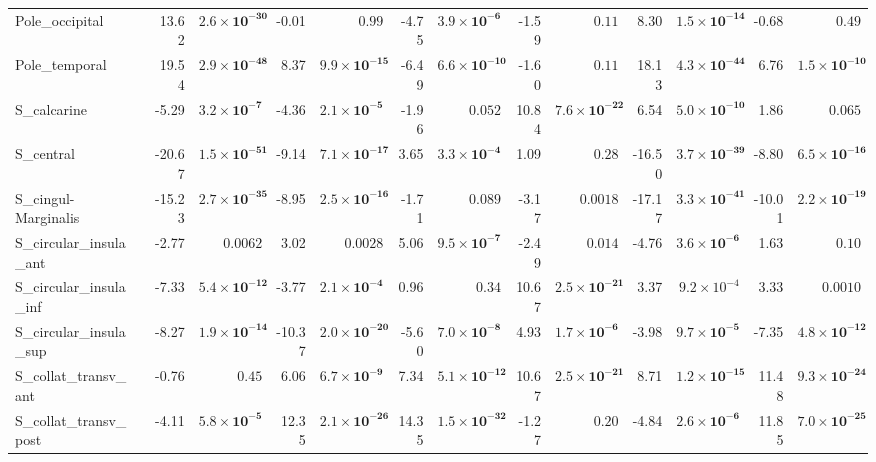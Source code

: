 {\begin{longtable}{llrrrrrrrrrrrr}
Pole\_occipital &  & 13.62 & $\mathbf{2.6{\times}10^{-30}}$ & -0.01 & $0.99$ & -4.75 & $\mathbf{3.9{\times}10^{-6}}$ & -1.59 & $0.11$ & 8.30 & $\mathbf{1.5{\times}10^{-14}}$ & -0.68 & $0.49$ \\
Pole\_temporal &  & 19.54 & $\mathbf{2.9{\times}10^{-48}}$ & 8.37 & $\mathbf{9.9{\times}10^{-15}}$ & -6.49 & $\mathbf{6.6{\times}10^{-10}}$ & -1.60 & $0.11$ & 18.13 & $\mathbf{4.3{\times}10^{-44}}$ & 6.76 & $\mathbf{1.5{\times}10^{-10}}$ \\
S\_calcarine &  & -5.29 & $\mathbf{3.2{\times}10^{-7}}$ & -4.36 & $\mathbf{2.1{\times}10^{-5}}$ & -1.96 & $0.052$ & 10.84 & $\mathbf{7.6{\times}10^{-22}}$ & 6.54 & $\mathbf{5.0{\times}10^{-10}}$ & 1.86 & $0.065$ \\
S\_central &  & -20.67 & $\mathbf{1.5{\times}10^{-51}}$ & -9.14 & $\mathbf{7.1{\times}10^{-17}}$ & 3.65 & $\mathbf{3.3{\times}10^{-4}}$ & 1.09 & $0.28$ & -16.50 & $\mathbf{3.7{\times}10^{-39}}$ & -8.80 & $\mathbf{6.5{\times}10^{-16}}$ \\
S\_cingul-Marginalis &  & -15.23 & $\mathbf{2.7{\times}10^{-35}}$ & -8.95 & $\mathbf{2.5{\times}10^{-16}}$ & -1.71 & $0.089$ & -3.17 & $0.0018$ & -17.17 & $\mathbf{3.3{\times}10^{-41}}$ & -10.01 & $\mathbf{2.2{\times}10^{-19}}$ \\
S\_circular\_insula\_ant &  & -2.77 & $0.0062$ & 3.02 & $0.0028$ & 5.06 & $\mathbf{9.5{\times}10^{-7}}$ & -2.49 & $0.014$ & -4.76 & $\mathbf{3.6{\times}10^{-6}}$ & 1.63 & $0.10$ \\
S\_circular\_insula\_inf &  & -7.33 & $\mathbf{5.4{\times}10^{-12}}$ & -3.77 & $\mathbf{2.1{\times}10^{-4}}$ & 0.96 & $0.34$ & 10.67 & $\mathbf{2.5{\times}10^{-21}}$ & 3.37 & $9.2{\times}10^{-4}$ & 3.33 & $0.0010$ \\
S\_circular\_insula\_sup &  & -8.27 & $\mathbf{1.9{\times}10^{-14}}$ & -10.37 & $\mathbf{2.0{\times}10^{-20}}$ & -5.60 & $\mathbf{7.0{\times}10^{-8}}$ & 4.93 & $\mathbf{1.7{\times}10^{-6}}$ & -3.98 & $\mathbf{9.7{\times}10^{-5}}$ & -7.35 & $\mathbf{4.8{\times}10^{-12}}$ \\
S\_collat\_transv\_ant &  & -0.76 & $0.45$ & 6.06 & $\mathbf{6.7{\times}10^{-9}}$ & 7.34 & $\mathbf{5.1{\times}10^{-12}}$ & 10.67 & $\mathbf{2.5{\times}10^{-21}}$ & 8.71 & $\mathbf{1.2{\times}10^{-15}}$ & 11.48 & $\mathbf{9.3{\times}10^{-24}}$ \\
S\_collat\_transv\_post &  & -4.11 & $\mathbf{5.8{\times}10^{-5}}$ & 12.35 & $\mathbf{2.1{\times}10^{-26}}$ & 14.35 & $\mathbf{1.5{\times}10^{-32}}$ & -1.27 & $0.20$ & -4.84 & $\mathbf{2.6{\times}10^{-6}}$ & 11.85 & $\mathbf{7.0{\times}10^{-25}}$ \\

\end{longtable}}
